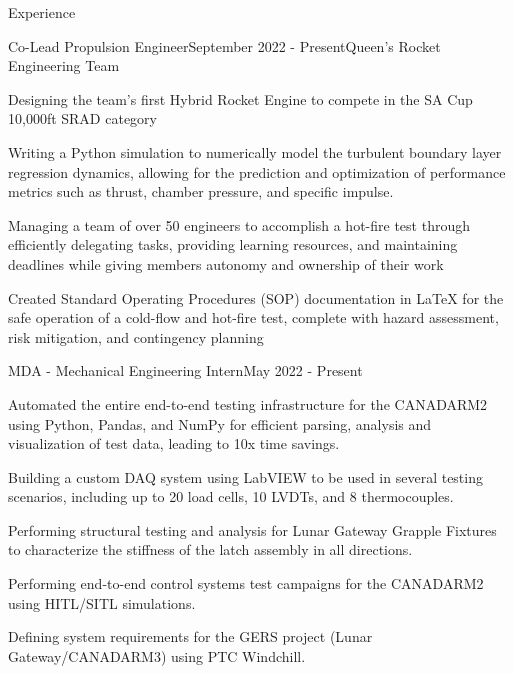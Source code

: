 \documentclass{resume} %
\begin{document}

\begin{rSection}{Experience}

\begin{rSubsection}{Co-Lead Propulsion Engineer}{September 2022 - Present}{Queen's Rocket Engineering Team}{}
\item Designing the team's first Hybrid Rocket Engine to compete in the SA Cup 10,000ft SRAD category
\item Writing a Python simulation to numerically model the turbulent boundary layer regression dynamics, allowing for the prediction and optimization of performance metrics such as thrust, chamber pressure, and specific impulse.
\item Managing a team of over 50 engineers to accomplish a hot-fire test through efficiently delegating tasks, providing learning resources, and maintaining deadlines while giving members autonomy and ownership of their work
\item Created Standard Operating Procedures (SOP) documentation in LaTeX for the safe operation of a cold-flow and hot-fire test, complete with hazard assessment, risk mitigation, and contingency planning

\end{rSubsection}

\begin{rSubsection}{MDA - Mechanical Engineering Intern}{May 2022 - Present}{}{}

\item Automated the entire end-to-end testing infrastructure for the CANADARM2 using Python, Pandas, and NumPy for efficient parsing, analysis and visualization of test data, leading to 10x time savings.
\item Building a custom DAQ system using LabVIEW to be used in several testing scenarios, including up to 20 load cells, 10 LVDTs, and 8 thermocouples.
\item Performing structural testing and analysis for Lunar Gateway Grapple Fixtures to characterize the stiffness of the latch assembly in all directions.
\item Performing end-to-end control systems test campaigns for the CANADARM2 using HITL/SITL simulations.
\item Defining system requirements for the GERS project (Lunar Gateway/CANADARM3) using PTC Windchill.


\end{rSubsection}
\end{rSection}
\end{document}
